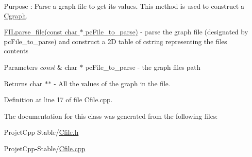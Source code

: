 Purpose \+: Parse a graph file to get its values. This method is used to construct a \hyperlink{class_cgraph}{Cgraph}. 

\hyperlink{class_cfile_a9709d0ec37058ca575e9708070254bf5}{F\+I\+Lparse\+\_\+file(const char $\ast$ pc\+File\+\_\+to\+\_\+parse)} -\/ parse the graph file (designated by pc\+File\+\_\+to\+\_\+parse) and construct a 2\+D table of cstring representing the file\textquotesingle{}s contents


\begin{DoxyParams}{Parameters}
{\em const} & char $\ast$ pc\+File\+\_\+to\+\_\+parse -\/ the graph file\textquotesingle{}s path\\
\hline
\end{DoxyParams}
\begin{DoxyReturn}{Returns}
char $\ast$$\ast$ -\/ All the values of the graph in the file. 
\end{DoxyReturn}


Definition at line 17 of file Cfile.\+cpp.



The documentation for this class was generated from the following files\+:\begin{DoxyCompactItemize}
\item 
Projet\+Cpp-\/\+Stable/\hyperlink{_cfile_8h}{Cfile.\+h}\item 
Projet\+Cpp-\/\+Stable/\hyperlink{_cfile_8cpp}{Cfile.\+cpp}\end{DoxyCompactItemize}
